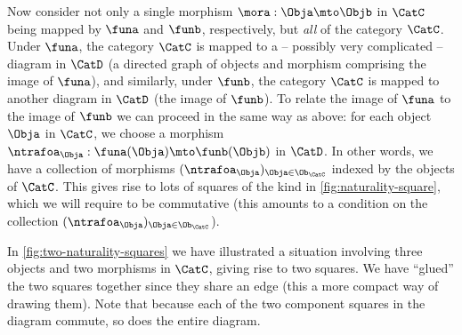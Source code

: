 %
\begin{marginfigure}
\centering
    \caption{}
    \label{fig:naturality-square}
\end{marginfigure}
%

Now consider not only a single morphism $\mora : \Obja \mto \Objb$ in $\CatC$ being mapped by $\funa$ and $\funb$, respectively, but \emph{all} of the category $\CatC$. Under $\funa$, the category $\CatC$ is mapped to a -- possibly very complicated --  diagram in $\CatD$ (a directed graph of objects and morphism comprising the image of $\funa$), and similarly, under $\funb$, the category $\CatC$ is mapped to another diagram in $\CatD$ (the image of $\funb$). To relate the image of $\funa$ to the image of $\funb$ we can proceed in the same way as above: for each object $\Obja$ in $\CatC$, we choose a morphism $\ntrafoa_\Obja : \funa(\Obja) \mto \funb(\Objb)$ in $\CatD$. In other words, we have a collection of morphisms $(\ntrafoa_\Obja)_{\Obja \in \Ob_\CatC}$ indexed by the objects of $\CatC$. 
This gives rise to lots of squares of the kind in \cref{fig:naturality-square}, which we will require to be commutative (this amounts to a condition on the collection $(\ntrafoa_\Obja)_{\Obja \in \Ob_\CatC}$).  


In \cref{fig:two-naturality-squares} we have illustrated a situation involving three objects and two morphisms in $\CatC$, giving rise to two squares. We have ``glued'' the two squares together since they share an edge (this a more compact way of drawing them). Note that because each of the two component squares in the diagram commute, so does the entire diagram. 

%
\begin{marginfigure}
\centering
    \caption{}
    \label{fig:two-naturality-squares}
\end{marginfigure}
%



\


